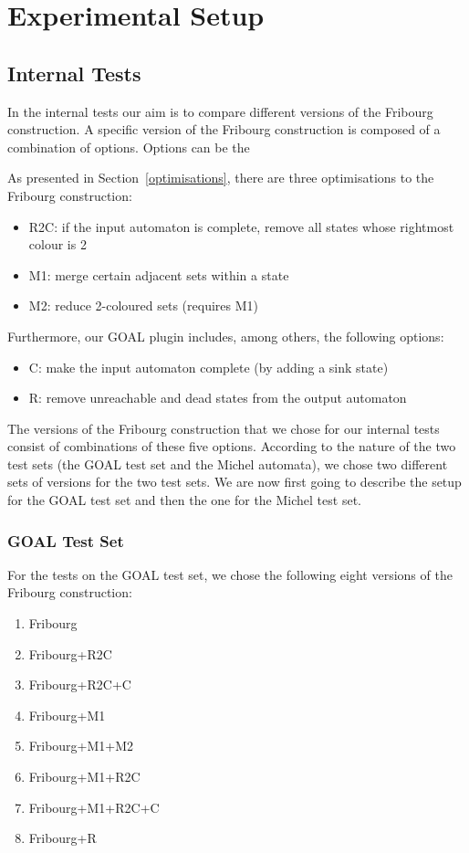 \section{Experimental Setup}
\label{4_exp_setup}

\subsection{Internal Tests}
\label{4_internal}
In the internal tests our aim is to compare different versions of the Fribourg construction. A specific version of the Fribourg construction is composed of a combination of options. Options can be the 

As presented in Section~\ref{optimisations}, there are three optimisations to the Fribourg construction:
\begin{itemize}
\item R2C: if the input automaton is complete, remove all states whose rightmost colour is 2
\item M1: merge certain adjacent sets within a state
\item M2: reduce 2-coloured sets (requires M1)
\end{itemize}

Furthermore, our GOAL plugin includes, among others, the following options:
\begin{itemize}
\item C: make the input automaton complete (by adding a sink state)
\item R: remove unreachable and dead states from the output automaton
\end{itemize}

The versions of the Fribourg construction that we chose for our internal tests consist of combinations of these five options. According to the nature of the two test sets (the GOAL test set and the Michel automata), we chose two different sets of versions for the two test sets. We are now first going to describe the setup for the GOAL test set and then the one for the Michel test set.


\subsubsection{GOAL Test Set}

For the tests on the GOAL test set, we chose the following eight versions of the Fribourg construction:
\begin{enumerate}
\item Fribourg
\item Fribourg+R2C
\item Fribourg+R2C+C
\item Fribourg+M1
\item Fribourg+M1+M2
\item Fribourg+M1+R2C
\item Fribourg+M1+R2C+C
\item Fribourg+R
\end{enumerate}

